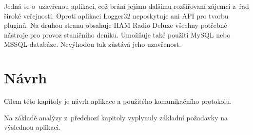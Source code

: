 Jedná se o~uzavřenou aplikaci, což brání jejímu dalšímu rozšířovaní zájemci
z~řad široké veřejnosti. Oproti aplikaci
Logger32 neposkytuje ani API pro tvorbu pluginů. Na druhou stranu obsahuje HAM Radio Deluxe všechny
potřebné nástroje pro provoz staničního deníku. Umožňuje také použití MySQL nebo MSSQL databáze.
Nevýhodou tak zůstává jeho uzavřenost.


\chapter{Návrh}
\label{navrh}

Cílem této kapitoly je návrh aplikace a použitého komunikačního protokolu.

Na základě analýzy z~předchozí kapitoly vyplynuly základní požadavky
na výslednou aplikaci.

